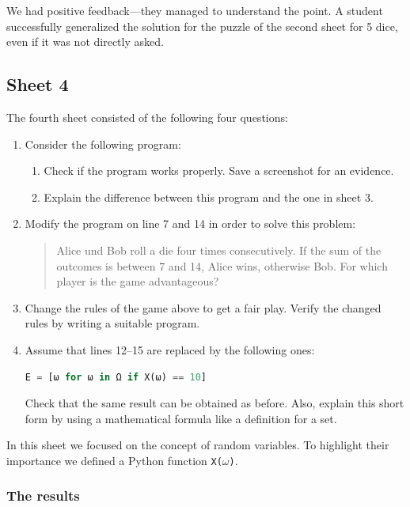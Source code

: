 \documentclass[]{interact}
\theoremstyle{plain}%
\theoremstyle{definition}
\theoremstyle{remark}
\begin{document}
We had positive feedback---they managed to understand the point. A student successfully generalized the 
solution for the puzzle of the second sheet for 5 dice, even if it was not directly asked.

\subsection*{Sheet 4}

The fourth sheet consisted of the following four questions:

\begin{enumerate}
\item Consider the following program:


\begin{enumerate}
\item Check if the program works properly. Save a screenshot for an evidence.
\item Explain the difference between this program and the one in sheet 3.
\end{enumerate}

\item Modify the program on line 7 and 14 in order to solve this problem:
\begin{quote}
Alice und Bob roll a die four times consecutively.
If the sum of the outcomes is between 7 and 14, Alice wins, otherwise Bob.
For which player is the game advantageous?
\end{quote}

\item Change the rules of the game above to get a fair play.
Verify the changed rules by writing a suitable program.

\item Assume that lines 12--15 are replaced by the following ones:
\begin{lstlisting}[language=Python,numbers=none]
E = [ω for ω in Ω if X(ω) == 10]
\end{lstlisting}
Check that the same result can be obtained as before.
Also, explain this short form by using a mathematical formula like a definition for a set.
\end{enumerate}

In this sheet we focused on the concept of random variables. To highlight their importance
we defined a Python function \texttt{X($\omega$)}.

\subsubsection*{The results}
\end{document}
